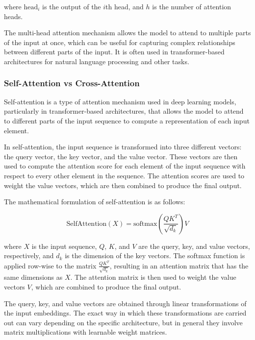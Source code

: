 where $\text{head}_i$ is the output of the $i$th head, and $h$ is the number of attention heads.

The multi-head attention mechanism allows the model to attend to multiple parts of the input at once, which can be useful for capturing complex relationships between different parts of the input. It is often used in transformer-based architectures for natural language processing and other tasks.

\subsubsection{Self-Attention vs Cross-Attention}
\label{subsubsec:3_self_attention_vs_cross_attention}

Self-attention is a type of attention mechanism used in deep learning models, particularly in transformer-based architectures, that allows the model to attend to different parts of the input sequence to compute a representation of each input element.

In self-attention, the input sequence is transformed into three different vectors: the query vector, the key vector, and the value vector. These vectors are then used to compute the attention score for each element of the input sequence with respect to every other element in the sequence. The attention scores are used to weight the value vectors, which are then combined to produce the final output.

The mathematical formulation of self-attention is as follows:

\begin{equation}
	\text{SelfAttention}(X) = \text{softmax}\left(\frac{QK^T}{\sqrt{d_k}}\right)V
\end{equation}

where $X$ is the input sequence, $Q$, $K$, and $V$ are the query, key, and value vectors, respectively, and $d_k$ is the dimension of the key vectors. The softmax function is applied row-wise to the matrix $\frac{QK^T}{\sqrt{d_k}}$, resulting in an attention matrix that has the same dimensions as $X$. The attention matrix is then used to weight the value vectors $V$, which are combined to produce the final output.

The query, key, and value vectors are obtained through linear transformations of the input embeddings. The exact way in which these transformations are carried out can vary depending on the specific architecture, but in general they involve matrix multiplications with learnable weight matrices.

